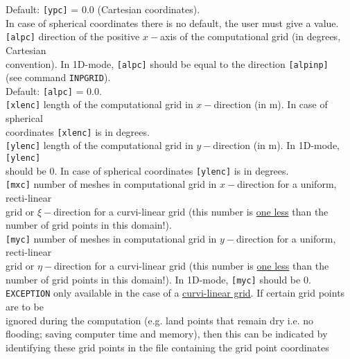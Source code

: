 \documentclass[12pt]{book}
\begin{document}
\begin{tabbing}
                     Default: {\tt [ypc]} = 0.0 (Cartesian coordinates).\\
                     In case of spherical coordinates there is no default, the user must give a value.\-\\
{\tt [alpc]}      \> direction of the positive $x-$axis of the computational grid (in degrees, Cartesian\+\\
                     convention). In 1D-mode, {\tt [alpc]} should be equal to the direction {\tt [alpinp]}\\
                     (see command {\tt INPGRID}).\\
                     Default: {\tt [alpc]} = 0.0.\-\\
{\tt [xlenc]}     \> length of the computational grid in $x-$direction (in m). In case of spherical\+\\
                     coordinates {\tt [xlenc]} is in degrees.\-\\
{\tt [ylenc]}     \> length of the computational grid in $y-$direction (in m). In 1D-mode, {\tt [ylenc]}\+\\
                     should be 0. In case of spherical coordinates {\tt [ylenc]} is in degrees.\-\\
{\tt [mxc]}       \> number of meshes in computational grid in $x-$direction for a uniform, recti-linear\+\\
                     grid or $\xi-$direction for a curvi-linear grid (this number is \underline{one less} than the\\
                     number of grid points in this domain!).\-\\
{\tt [myc]}       \> number of meshes in computational grid in $y-$direction for a uniform, recti-linear\+\\
                     grid or $\eta-$direction for a curvi-linear grid (this number is \underline{one less} than the\\
                     number of grid points in this domain!). In 1D-mode, {\tt [myc]} should be 0.\-\\
{\tt EXCEPTION}   \> only available in the case of a \underline{curvi-linear grid}. If certain grid points are to be\+\\
                     ignored during the computation (e.g. land points that remain dry i.e. no\\
                     flooding; saving computer time and memory), then this can be indicated by\\
                     identifying these grid points in the file containing the grid point coordinates\\

\end{tabbing}
\end{document}
